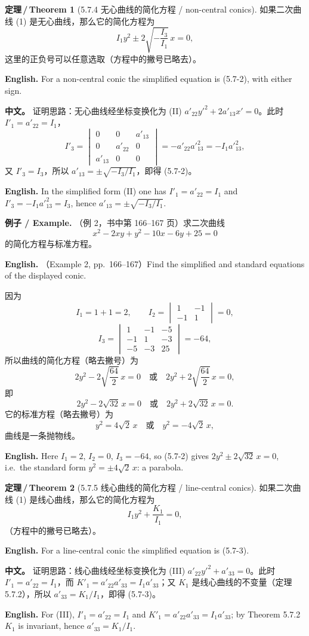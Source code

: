 \documentclass[UTF8,11pt,a4paper]{ctexart}
\newcommand{\APS}[2]{\par\noindent\textbf{中文。} #1\par\noindent\textbf{English.} #2\par\smallskip}
\newcommand{\EN}[1]{\par\noindent \textbf{English.} #1\par}
\newcommand{\EX}[2]{\par\noindent \textbf{例子 / Example.} #1\par\EN{#2}}
\theoremstyle{definition}
\newtheorem*{theorem}{定理\,/\,Theorem}
\begin{document}
\begin{theorem}[5.7.4 无心曲线的简化方程 / non-central conics]\label{thm:inv-noncentral}
如果二次曲线 (1) 是无心曲线，那么它的简化方程为
\[
I_1y^2\pm2\sqrt{-\frac{I_3}{I_1}}\,x=0,\tag{5.7-2}
\]
这里的正负号可以任意选取（方程中的撇号已略去）。
\EN{For a non-central conic the simplified equation is (5.7-2), with either sign.}
\end{theorem}

\APS{证明思路：无心曲线经坐标变换化为 (II) $a'_{22}y'^2+2a'_{13}x'=0$。此时 $I'_1=a'_{22}=I_1$，
\[
I'_3=\begin{vmatrix}0&0&a'_{13}\\ 0&a'_{22}&0\\ a'_{13}&0&0\end{vmatrix}=-a'_{22}a'^2_{13}=-I_1a'^2_{13},
\]
又 $I'_3=I_3$，所以 $a'_{13}=\pm\sqrt{-I_3/I_1}$，即得 (5.7-2)。}{In the simplified form (II) one has $I'_1=a'_{22}=I_1$ and $I'_3=-I_1a'^2_{13}=I_3$, hence $a'_{13}=\pm\sqrt{-I_3/I_1}$.}

\EX{（例 2，书中第 166--167 页）求二次曲线
\[
x^2-2xy+y^2-10x-6y+25=0
\]
的简化方程与标准方程。}{（Example 2, pp.~166--167）Find the simplified and standard equations of the displayed conic.}
因为
\[
I_1=1+1=2,\qquad I_2=\begin{vmatrix}1&-1\\ -1&1\end{vmatrix}=0,
\]
\[
I_3=\begin{vmatrix}1&-1&-5\\ -1&1&-3\\ -5&-3&25\end{vmatrix}=-64,
\]
所以曲线的简化方程（略去撇号）为
\[
2y^2-2\sqrt{\frac{64}{2}}\,x=0\quad\text{或}\quad 2y^2+2\sqrt{\frac{64}{2}}\,x=0,
\]
即
\[
2y^2-2\sqrt{32}\,x=0\quad\text{或}\quad 2y^2+2\sqrt{32}\,x=0.
\]
它的标准方程（略去撇号）为
\[
y^2=4\sqrt2\,x\quad\text{或}\quad y^2=-4\sqrt2\,x,
\]
曲线是一条抛物线。
\EN{Here $I_1=2$, $I_2=0$, $I_3=-64$, so (5.7-2) gives $2y^2\pm2\sqrt{32}\,x=0$, i.e.\ the standard form $y^2=\pm4\sqrt2\,x$: a parabola.}

\begin{theorem}[5.7.5 线心曲线的简化方程 / line-central conics]\label{thm:inv-linecentral}
如果二次曲线 (1) 是线心曲线，那么它的简化方程为
\[
I_1y^2+\frac{K_1}{I_1}=0,\tag{5.7-3}
\]
（方程中的撇号已略去）。
\EN{For a line-central conic the simplified equation is (5.7-3).}
\end{theorem}

\APS{证明思路：线心曲线经坐标变换化为 (III) $a'_{22}y'^2+a'_{33}=0$。此时 $I'_1=a'_{22}=I_1$，而 $K'_1=a'_{22}a'_{33}=I_1a'_{33}$；又 $K_1$ 是线心曲线的不变量（定理 5.7.2），所以 $a'_{33}=K_1/I_1$，即得 (5.7-3)。}{For (III), $I'_1=a'_{22}=I_1$ and $K'_1=a'_{22}a'_{33}=I_1a'_{33}$; by Theorem 5.7.2 $K_1$ is invariant, hence $a'_{33}=K_1/I_1$.}
\end{document}
